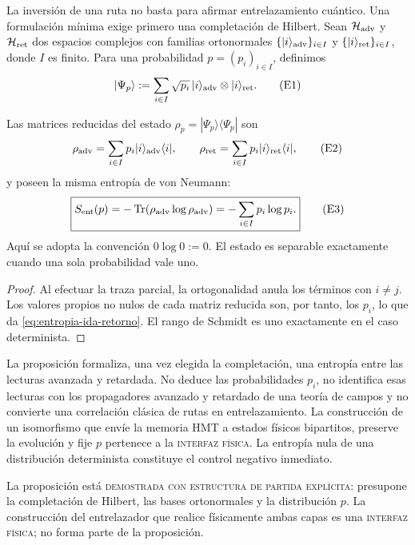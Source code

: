 La inversión de una ruta no basta para afirmar entrelazamiento cuántico. Una
formulación mínima exige primero una completación de Hilbert. Sean
\(\mathcal H_{\rm adv}\) y \(\mathcal H_{\rm ret}\) dos espacios complejos
con familias ortonormales
\(\{|i\rangle_{\rm adv}\}_{i\in I}\) y
\(\{|i\rangle_{\rm ret}\}_{i\in I}\), donde \(I\) es finito. Para una
probabilidad \(p=(p_i)_{i\in I}\), definimos
\[
 |\Psi_p\rangle
 :=\sum_{i\in I}\sqrt{p_i}\,
 |i\rangle_{\rm adv}\otimes|i\rangle_{\rm ret}.
 \tag{E1}\label{eq:estado-entrelazado-ida-retorno}
\]

\begin{proposition}
\label{prop:entropia-entrelazamiento-ida-retorno}
Las matrices reducidas del estado
\(\rho_p=|\Psi_p\rangle\langle\Psi_p|\) son
\[
 \rho_{\rm adv}
 =\sum_{i\in I}p_i|i\rangle_{\rm adv}\langle i|,
 \qquad
 \rho_{\rm ret}
 =\sum_{i\in I}p_i|i\rangle_{\rm ret}\langle i|,
 \tag{E2}\label{eq:reducidas-ida-retorno}
\]
y poseen la misma entropía de von Neumann:
\[
 \boxed{
 S_{\rm ent}(p)
 =-\operatorname{Tr}(\rho_{\rm adv}\log\rho_{\rm adv})
 =-\sum_{i\in I}p_i\log p_i.}
 \tag{E3}\label{eq:entropia-ida-retorno}
\]
Aquí se adopta la convención \(0\log0:=0\). El estado es separable
exactamente cuando una sola probabilidad vale uno.
\end{proposition}

\begin{proof}
Al efectuar la traza parcial, la ortogonalidad anula los términos con
\(i\ne j\). Los valores propios no nulos de cada matriz reducida son, por
tanto, los \(p_i\), lo que da \eqref{eq:entropia-ida-retorno}. El rango de
Schmidt es uno exactamente en el caso determinista.
\end{proof}

La proposición formaliza, una vez elegida la completación, una entropía entre
las lecturas avanzada y retardada. No deduce las probabilidades \(p_i\), no
identifica esas lecturas con los propagadores avanzado y retardado de una
teoría de campos y no convierte una correlación clásica de rutas en
entrelazamiento. La construcción de un isomorfismo que envíe la memoria HMT
a estados físicos bipartitos, preserve la evolución y fije \(p\) pertenece a
la \textsc{interfaz física}. La entropía nula de una distribución
determinista constituye el control negativo inmediato.

\begin{statusbox}
La proposición está
\textsc{demostrada con estructura de partida explícita}: presupone la
completación de Hilbert, las bases ortonormales y la distribución \(p\). La construcción
del entrelazador que realice físicamente ambas capas es una
\textsc{interfaz física}; no forma parte de la proposición.
\end{statusbox}

